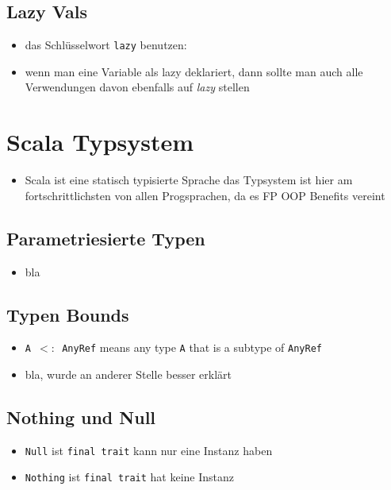 \subsection{Lazy Vals}
\begin{itemize}
  \item das Schlüsselwort \texttt{lazy} benutzen:
  
   
  \item wenn man eine Variable als lazy deklariert, dann sollte man auch alle
  Verwendungen davon ebenfalls auf \textit{lazy} stellen 
\end{itemize}
\pagebreak


\section{Scala Typsystem}
\begin{itemize}
  \item Scala ist eine statisch typisierte Sprache \und das Typsystem ist 
  hier am fortschrittlichsten von allen Progsprachen, da es FP \und 
  OOP Benefits vereint
\end{itemize}


\subsection{Parametriesierte Typen}
\begin{itemize}
  \item bla
\end{itemize}


\subsection{Typen Bounds}
\begin{itemize}
  \item \texttt{A $<:$ AnyRef} means any type \texttt{A} that is a subtype of \texttt{AnyRef}
  \item bla, wurde an anderer Stelle besser erklärt
\end{itemize}


\subsection{Nothing und Null}
\begin{itemize}
  \item \texttt{Null} ist \texttt{final trait} \und kann nur eine Instanz haben
  \item \texttt{Nothing} ist \texttt{final trait} \und hat keine Instanz
\end{itemize}


